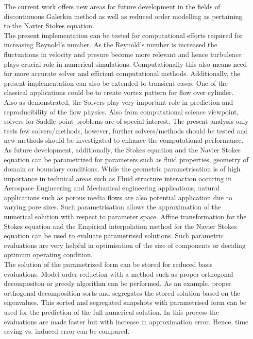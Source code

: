 \documentclass[a4paper,openany]{book}
\begin{document}
The current work offers new areas for future development in the fields of discontinuous Galerkin method as well as reduced order modelling as pertaining to the Navier Stokes equation. \\

The present implementation can be tested for computational efforts  required for increasing Reynold's number. As the Reynold's number is increased the fluctuations in velocity and presure become more relevant and hence turbulence plays crucial role in numerical simulations. Computationally this also means need for more accurate solver and efficient computational methods. Additionally, the present implementation can also be extended to transient cases. One of the classical applications could be to create vortex pattern for flow over cylinder.\\

Also as demonstrated, the Solvers play very important role in prediction and reproducibility of the flow physics. Also from computational science viewpoint, solvers for Saddle point problems are of special interest. The present analysis only tests few solvers/methods, however, further solvers/methods should be tested and new methods should be investigated to enhance the computational performance.\\

As future development, additionally, the Stokes equation and the Navier Stokes equation can be parametrized for parameters such as fluid properties, geometry of domain or boundary conditions. While the geometric parametrisation is of high importance in technical areas such as Fluid structure interaction occuring in Aerospace Engineering and Mechanical engineering applications, natural applications such as porous media flows are also potential application due to varying pore sizes. Such parametrisation allows the approximation of the numerical solution with respect to parameter space. Affine transformation for the Stokes equation and the Empirical interpolation method for the Navier Stokes equation can be used to evaluate parametrised solutions. Such parametric evaluations are very helpful in optimisation of the size of components or deciding optimum operating condition. \\

The solution of the parametrized form can be stored for reduced basis evaluations. Model order reduction with a method such as proper orthogonal decompositon or greedy algorithm can be performed. As an example, proper orthogonal decomposition sorts and segregates the stored solution based on the eigenvalues. This sorted and segregated snapshots with parametrised form can be used for the prediction of the full numerical solution. In this process the evaluations are made faster but with increase in approximation error. Hence, time saving vs. induced error can be compared.
\end{document}
